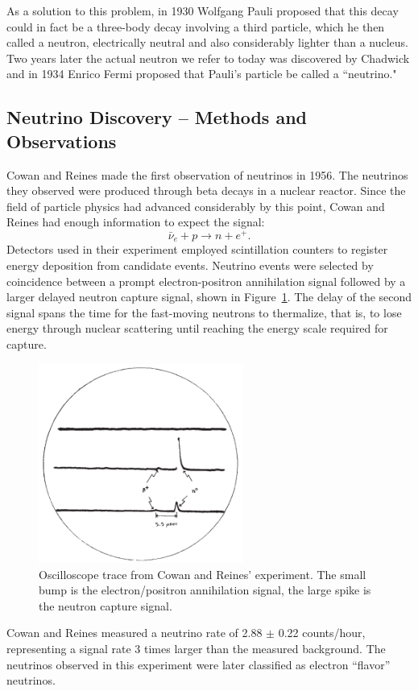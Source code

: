 As a solution to this problem, in 1930 Wolfgang Pauli proposed that this decay could in fact be a three-body decay involving a third particle, which he then called a neutron, electrically neutral and also considerably lighter than a nucleus. \cite{pauliNeuProp}  Two years later the actual neutron we refer to today was discovered by Chadwick \cite{chadwickNeutron} and in 1934 Enrico Fermi proposed that Pauli's particle be called a ``neutrino." \cite{fermiNeuName} 

\subsection{Neutrino Discovery -- Methods and Observations}
\label{discovery}


Cowan and Reines made the first observation of neutrinos in 1956.  The neutrinos they observed were produced through beta decays in a nuclear reactor.  Since the field of particle physics had advanced considerably by this point, Cowan and Reines had enough information to expect the signal: 
\begin{equation} \label{beta} \bar{\nu}_e + p \rightarrow n + e^+.  \end{equation}
Detectors used in their experiment employed scintillation counters to register energy deposition from candidate events.  Neutrino events were selected by coincidence between a prompt electron-positron annihilation signal followed by a larger delayed neutron capture signal, shown in Figure~\ref{oscilloscope}.  The delay of the second signal spans the time for the fast-moving neutrons to thermalize, that is, to lose energy through nuclear scattering until reaching the energy scale required for capture. 
\begin{figure}[b!]
  \begin{center}
    \includegraphics[width=0.6\textwidth]{figures/figures/cowanOscilloscope.png}
  \end{center}
  \caption{Oscilloscope trace from Cowan and Reines' experiment.  The small bump is the electron/positron annihilation signal, the large spike is the neutron capture signal.}
  \label{oscilloscope}
\end{figure}
Cowan and Reines measured a neutrino rate of 2.88 $\pm$ 0.22 counts/hour, representing a signal rate 3 times larger than the measured background.  \cite{cowan}  The neutrinos observed in this experiment were later classified as electron ``flavor''  neutrinos.

